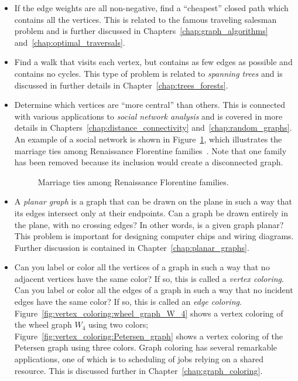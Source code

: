 \begin{itemize}
\item If the edge weights are all non-negative, find a ``cheapest''
  closed path which contains all the vertices. This is related to the
  famous traveling salesman problem
  and is further discussed in Chapters~\ref{chap:graph_algorithms}
  and~\ref{chap:optimal_traversals}.

\item Find a walk that visits each vertex, but contains as few edges
  as possible and contains no cycles. This type of problem is related
  to \emph{spanning trees} and is discussed in
  further details in Chapter~\ref{chap:trees_forests}.

\item Determine which vertices are ``more central'' than others. This
  is connected with various applications to
  \emph{social network analysis} and is
  covered in more details in Chapters~\ref{chap:distance_connectivity}
  and~\ref{chap:random_graphs}. An example of a social network is shown
  in Figure~\ref{fig:introduction:marriage_ties_Renaissance}, which
  illustrates the marriage ties among
  Renaissance Florentine
  families~\cite{Borgatti2005}. Note that one family has been removed
  because its inclusion would create a disconnected graph.

\begin{figure}[!htbp]
\centering
{}

\caption{Marriage ties among Renaissance Florentine families.}
\label{fig:introduction:marriage_ties_Renaissance}
\end{figure}

\item A \emph{planar graph} is a graph that can be
  drawn on the plane in such a way that its edges intersect only at
  their endpoints. Can a graph be drawn entirely in the plane, with no
  crossing edges? In other words, is a given graph planar? This
  problem is important for designing computer chips and wiring
  diagrams. Further discussion is contained in
  Chapter~\ref{chap:planar_graphs}.

\item Can you label or color all the vertices of a graph in such a
  way that no adjacent vertices have the same color? If so, this is
  called a \emph{vertex coloring}. Can you
  label or color all the edges of a graph in such a way that no
  incident edges have the same color? If so, this is called an
  \emph{edge coloring}.
  Figure~\ref{fig:vertex_coloring:wheel_graph_W_4} shows a vertex
  coloring of the wheel graph $W_4$ using two
  colors; Figure~\ref{fig:vertex_coloring:Petersen_graph} shows a
  vertex coloring of the Petersen graph using
  three colors. Graph coloring has several remarkable applications,
  one of which is to scheduling of jobs relying on a shared
  resource. This is discussed further in
  Chapter~\ref{chap:graph_coloring}.


\end{itemize}
